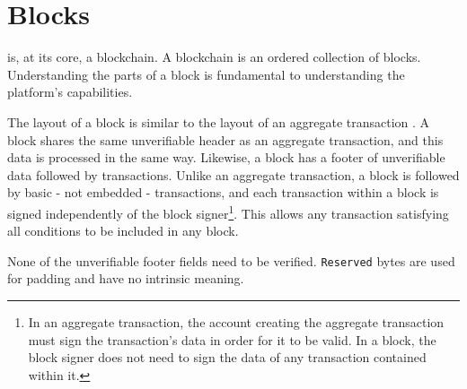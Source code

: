 \section{Blocks}
\label{sec:blocks}

\nemquote{
}{}

\codenamechapterfirstword is, at its core, a blockchain.
A blockchain is an ordered collection of blocks.
Understanding the parts of a \codenamespace block is fundamental to understanding the platform's capabilities.

The layout of a block is similar to the layout of an aggregate transaction .
A block shares the same unverifiable header as an aggregate transaction, and this data is processed in the same way.
Likewise, a block has a footer of unverifiable data followed by transactions.
Unlike an aggregate transaction, a block is followed by basic - not embedded - transactions, and each transaction within a block is signed independently of the block signer\footnote{
In an aggregate transaction, the account creating the aggregate transaction must sign the transaction's data in order for it to be valid.
In a block, the block signer does not need to sign the data of any transaction contained within it.
}.
This allows any transaction satisfying all conditions to be included in any block.

None of the unverifiable footer fields need to be verified.
\texttt{Reserved} bytes are used for padding and have no intrinsic meaning.

